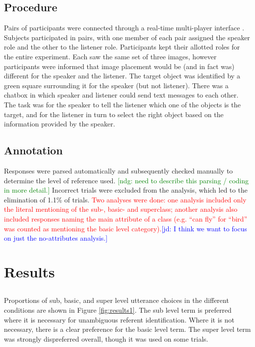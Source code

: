 \documentclass[10pt,letterpaper]{article}
\newcommand{\red}[1]{\textcolor{Red}{#1}}
\newcommand{\ndg}[1]{\textcolor{Green}{[ndg: #1]}}
\newcommand{\jd}[1]{\textcolor{Blue}{[jd: #1]}}
\newcommand{\figref}[1]{Figure \ref{#1}}
\begin{document}
\subsection{\bf Procedure}
Pairs of participants were connected through a real-time multi-player interface \cite{Hawkins15_RealTimeWebExperiments}. Subjects participated in pairs, with one member of each pair assigned the speaker role and the other to the listener role. Participants kept their allotted roles for the entire experiment. 
Each saw the same set of three images, however participants were informed that image placement would be (and in fact was) different for the speaker and the listener. The target object was identified by a green square surrounding it for the speaker (but not listener). There was a chatbox in which speaker and listener could send text messages to each other. The task was for the speaker to tell the listener which one of the objects is the target, and for the listener in turn to select the right object based on the information provided by the speaker. 

\subsection{\bf Annotation}
Responses were parsed automatically and subsequently checked manually to determine the level of reference used. 
\ndg{need to describe this parsing / coding in more detail.}
Incorrect trials were excluded from the analysis, which led to the elimination of 1.1\% of trials. \red{Two analyses were done: one analysis included only the literal mentioning of the sub-, basic- and superclass; another analysis also included responses naming the main attribute of a class (e.g. ``can fly'' for ``bird'' was counted as mentioning the basic level category).}\jd{I think we want to focus on just the no-attributes analysis.} 

\section{\bf Results}

\subsection{}
Proportions of sub, basic, and super level utterance choices in the different conditions are shown in \figref{fig:results1}. The sub level term is preferred where it is necessary for unambiguous referent identification. Where it is not necessary, there is a clear preference for the basic level term. The super level term was strongly dispreferred overall, though it was used on some trials. 
\end{document}
